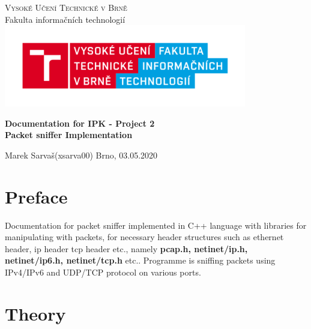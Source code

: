 \documentclass{article}
\begin{document}

	\begin{titlepage}
		\begin{center}
			\textsc{\Huge Vysoké Učení Technické v Brně} \\[0.7cm]
			{\Huge Fakulta informačních technologií}
			\center\includegraphics[width=0.5\linewidth]{./logo.png}

			\vspace{5cm}

			\textbf{{\Huge Documentation for IPK - Project 2}}\\[0.4cm]
			\textbf{{\LARGE Packet sniffer Implementation}}\\[0.4cm]
	
			
		\end{center}
		\vfill

		\begin{flushleft}
			\begin{Large}
				
				Marek Sarvaš\hspace{37px}(xsarva00)\hspace{19px} 
			\hfill
			Brno, 03.05.2020
			\end{Large}
		\end{flushleft}

	\end{titlepage}


	\tableofcontents
	\newpage
\section{Preface}
Documentation for packet sniffer implemented in C++ language with libraries for manipulating with packets, for necessary header structures such as ethernet header, ip header tcp header etc., namely \textbf{pcap.h, netinet/ip.h, netinet/ip6.h, netinet/tcp.h} etc.. Programme is sniffing packets using IPv4/IPv6 and UDP/TCP protocol on various ports.  
\section{Theory}
\end{document}

